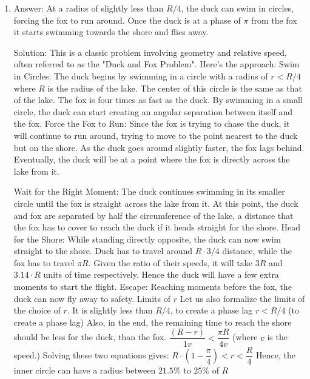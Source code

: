 \begin{enumerate}
\item
Answer: At a radius of slightly less than $R/4$, the duck can swim in circles, forcing the fox to run around. Once the duck is at a phase of $\pi$ from the fox it starts swimming towards the shore and flies away.
 
Solution: This is a classic problem involving geometry and relative speed, often referred to as the "Duck and Fox Problem". Here's the approach:
Swim in Circles: The duck begins by swimming in a circle with a radius of $r < R/4$ where $R$ is the radius of the lake. The center of this circle is the same as that of the lake. The fox is four times as fast as the duck. By swimming in a small circle, the duck can start creating an angular separation between itself and the fox.
Force the Fox to Run: Since the fox is trying to chase the duck, it will continue to run around, trying to move to the point nearest to the duck but on the shore. As the duck goes around slightly faster, the fox lags behind. Eventually, the duck will be at a point where the fox is directly across the lake from it.

Wait for the Right Moment: The duck continues swimming in its smaller circle until the fox is straight across the lake from it. At this point, the duck and fox are separated by half the circumference of the lake, a distance that the fox has to cover to reach the duck if it heads straight for the shore.
Head for the Shore: While standing directly opposite, the duck can now swim straight to the shore. Duck has to travel around $R \cdot 3/4$ distance, while the fox has to travel $\pi R$. Given the ratio of their speeds, it will take $3 R$ and $3.14 \cdot R$ units of time respectively. Hence the duck will have a few extra moments to start the flight.
Escape: Reaching moments before the fox, the duck can now fly away to safety.
Limits of $r$
Let us also formalize the limits of the choice of $r$.
It is slightly less than $R/4$, to create a phase lag
$r < R/4$ (to create a phase lag)
Also, in the end, the remaining time to reach the shore should be less for the duck, than the fox.
$\dfrac{(R-r)}{1v} < \dfrac{\pi R}{4v}$ (where $v$ is the speed.)
Solving these two equations gives:
${R} \cdot (1 - \dfrac{\pi}{4}) < r < \dfrac{R}{4}$
Hence, the inner circle can have a radius between $21.5\%$ to $25\%$ of $R$





\end{enumerate}
